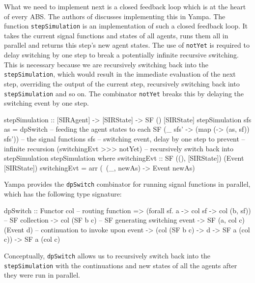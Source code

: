 What we need to implement next is a closed feedback loop which is at the heart of every ABS. The authors of \cite{courtney_yampa_2003, nilsson_functional_2002} discusses implementing this in Yampa. The function \texttt{stepSimulation} is an implementation of such a closed feedback loop. It takes the current signal functions and states of all agents, runs them all in parallel and returns this step's new agent states. The use of \texttt{notYet} is required to delay switching by one step to break a potentially infinite recursive switching. This is necessary because we are recursively switching back into the \texttt{stepSimulation}, which would result in the immediate evaluation of the next step, overriding the output of the current step, recursively switching back into \texttt{stepSimulation} and so on. The combinator \texttt{notYet} breaks this by delaying the switching event by one step.

\begin{HaskellCode}
stepSimulation :: [SIRAgent] -> [SIRState] -> SF () [SIRState]
stepSimulation sfs as =
    dpSwitch
      -- feeding the agent states to each SF
      (\_ sfs' -> (map (\sf -> (as, sf)) sfs'))
      -- the signal functions
      sfs
      -- switching event, delay by one step to prevent
      -- infinite recursion
      (switchingEvt >>> notYet)
      -- recursively switch back into stepSimulation         
      stepSimulation                            
  where
    switchingEvt :: SF ((), [SIRState]) (Event [SIRState])
    switchingEvt = arr (\ (_, newAs) -> Event newAs)
\end{HaskellCode}

Yampa provides the \texttt{dpSwitch} combinator for running signal functions in parallel, which has the following type signature:

\begin{HaskellCode}
dpSwitch :: Functor col
         -- routing function
         => (forall sf. a -> col sf -> col (b, sf))
         -- SF collection
         -> col (SF b c)
         -- SF generating switching event     
         -> SF (a, col c) (Event d)
         -- continuation to invoke upon event           
         -> (col (SF b c) -> d -> SF a (col c))
         -> SF a (col c)
\end{HaskellCode}

Conceptually, \texttt{dpSwitch} allows us to recursively switch back into the \texttt{stepSimulation} with the continuations and new states of all the agents after they were run in parallel. 


